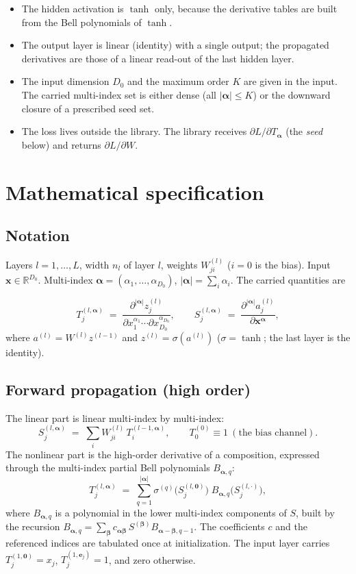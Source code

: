 \documentclass[10pt,a4paper]{article}
\newcommand{\mi}[1]{\boldsymbol{#1}}
\begin{document}
\begin{itemize}[leftmargin=1.4em]
\item The hidden activation is $\tanh$ only, because the derivative
      tables are built from the Bell polynomials of $\tanh$.
\item The output layer is linear (identity) with a single output; the
      propagated derivatives are those of a linear read-out of the
      last hidden layer.
\item The input dimension $D_0$ and the maximum order $K$ are given in
      the input. The carried multi-index set is either dense (all
      $|\mi{\alpha}|\le K$) or the downward closure of a prescribed
      seed set.
\item The loss lives outside the library. The library receives
      $\partial L/\partial T_{\mi\alpha}$ (the \emph{seed} below) and
      returns $\partial L/\partial W$.
\end{itemize}

\section{Mathematical specification}

\subsection{Notation}

Layers $l=1,\dots,L$, width $n_l$ of layer $l$, weights
$W^{(l)}_{ji}$ ($i=0$ is the bias). Input
$\mi{x}\in\mathbb{R}^{D_0}$. Multi-index
$\mi\alpha=(\alpha_1,\dots,\alpha_{D_0})$,
$|\mi\alpha|=\sum_i\alpha_i$. The carried quantities are

\[
T^{(l,\mi\alpha)}_j \;=\; \frac{\partial^{|\mi\alpha|} z^{(l)}_j}{\partial x_1^{\alpha_1}\cdots \partial x_{D_0}^{\alpha_{D_0}}},
\qquad
S^{(l,\mi\alpha)}_j \;=\; \frac{\partial^{|\mi\alpha|} a^{(l)}_j}{\partial \mi{x}^{\mi\alpha}},
\]
where $a^{(l)}=W^{(l)}z^{(l-1)}$ and $z^{(l)}=\sigma(a^{(l)})$
($\sigma=\tanh$; the last layer is the identity).

\subsection{Forward propagation (high order)}
\label{sec:fwd}

The linear part is linear multi-index by multi-index:
\[
S^{(l,\mi\alpha)}_j \;=\; \sum_{i} W^{(l)}_{ji}\,T^{(l-1,\mi\alpha)}_i ,
\qquad
T^{(0)}_0 \equiv 1 \ (\text{the bias channel}).
\]
The nonlinear part is the high-order derivative of a composition,
expressed through the multi-index partial Bell polynomials
$B_{\mi\alpha,q}$:
\[
T^{(l,\mi\alpha)}_j \;=\; \sum_{q=1}^{|\mi\alpha|} \sigma^{(q)}\!\big(S^{(l,\mi 0)}_j\big)\;
B_{\mi\alpha,q}\big(S^{(l,\cdot)}_j\big),
\]
where $B_{\mi\alpha,q}$ is a polynomial in the lower multi-index
components of $S$, built by the recursion
$B_{\mi\alpha,q}=\sum_{\mi\beta} c_{\mi\alpha\mi\beta}\,S^{(\mi\beta)}B_{\mi\alpha-\mi\beta,q-1}$.
The coefficients $c$ and the referenced indices are tabulated once at
initialization. The input layer carries $T^{(1,\mi 0)}_j=x_j$,
$T^{(1,\mi e_j)}_j=1$, and zero otherwise.
\end{document}
